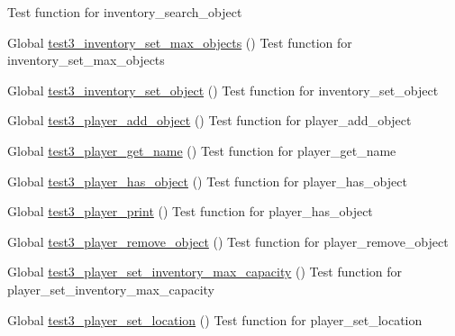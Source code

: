 \begin{DoxyRefList}
%
Test function for inventory\+\_\+search\+\_\+object  
\item[Global \mbox{\hyperlink{inventory__test_8h_a270c2d6aecda0d73fbcff6ca0c9a90db}{test3\+\_\+inventory\+\_\+set\+\_\+max\+\_\+objects}} ()]\label{test__test000048}%
%
Test function for inventory\+\_\+set\+\_\+max\+\_\+objects  
\item[Global \mbox{\hyperlink{inventory__test_8h_afeec9d3504d3663c7fb8884e1bb1562d}{test3\+\_\+inventory\+\_\+set\+\_\+object}} ()]\label{test__test000020}%
%
Test function for inventory\+\_\+set\+\_\+object  
\item[Global \mbox{\hyperlink{player__test_8h_ac984e5292c95002644a7af4fa499d0fb}{test3\+\_\+player\+\_\+add\+\_\+object}} ()]\label{test__test000067}%
%
Test function for player\+\_\+add\+\_\+object  
\item[Global \mbox{\hyperlink{player__test_8h_a47ca2429d85f332295322002954e1c89}{test3\+\_\+player\+\_\+get\+\_\+name}} ()]\label{test__test000060}%
%
Test function for player\+\_\+get\+\_\+name  
\item[Global \mbox{\hyperlink{player__test_8h_a956409720fca92e245d798491200f3d6}{test3\+\_\+player\+\_\+has\+\_\+object}} ()]\label{test__test000078}%
%
Test function for player\+\_\+has\+\_\+object  
\item[Global \mbox{\hyperlink{player__test_8h_a1d9fc6701483b45427b34a1d8e86e260}{test3\+\_\+player\+\_\+print}} ()]\label{test__test000086}%
%
Test function for player\+\_\+has\+\_\+object  
\item[Global \mbox{\hyperlink{player__test_8h_af84155cb375301e75475a91ef522e191}{test3\+\_\+player\+\_\+remove\+\_\+object}} ()]\label{test__test000070}%
%
Test function for player\+\_\+remove\+\_\+object  
\item[Global \mbox{\hyperlink{player__test_8h_ae3447f70a2f6ccb4f501f7630c667a73}{test3\+\_\+player\+\_\+set\+\_\+inventory\+\_\+max\+\_\+capacity}} ()]\label{test__test000083}%
%
Test function for player\+\_\+set\+\_\+inventory\+\_\+max\+\_\+capacity  
\item[Global \mbox{\hyperlink{player__test_8h_a317c0c84ef6ef843c15d5bab4a6b8a38}{test3\+\_\+player\+\_\+set\+\_\+location}} ()]\label{test__test000073}%
%
Test function for player\+\_\+set\+\_\+location  

\end{DoxyRefList}
